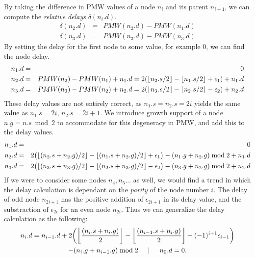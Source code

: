 By taking the difference in PMW values of a node $n_i$ and its parent $n_{i-1}$, we can compute the \emph{relative delays} $\delta(n_i.d)$.
\begin{eqnarray*}
  \delta(n_2.d) &=& PMW(n_2.d) - PMW(n_1.d) \\
  \delta(n_3.d) &=& PMW(n_3.d) - PMW(n_3.d)
\end{eqnarray*}
By setting the delay for the first node to some value, for example 0, we can find the node delay.
\begin{eqnarray*}
  n_1.d &=& 0 \\
  n_2.d &=& PMW(n_2) - PMW(n_1) + n_1.d = 2({\left \lfloor n_2.s/2 \right \rfloor } - {\left \lfloor n_1.s/2 \right \rfloor } + \epsilon_1) + n_1.d \\
  n_3.d &=& PMW(n_3) - PMW(n_2) + n_2.d = 2({\left \lfloor n_3.s/2 \right \rfloor } - {\left \lfloor n_2.s/2 \right \rfloor } - \epsilon_2) + n_2.d
\end{eqnarray*}
These delay values are not entirely correct, as $n_1.s = n_2.s = 2i$ yields the same value as  $n_1.s = 2i$, $n_2.s = 2i + 1$. We introduce growth support of a node $n.g = n.s \bmod 2$ to accommodate for this degeneracy in PMW, and add this to the delay values.
\begin{eqnarray*}
  n_1.d &=& 0 \\
  n_2.d &=& 2\big({\left \lfloor (n_2.s+n_2.g)/2 \right \rfloor } - {\left \lfloor (n_1.s+n_2.g)/2 \right \rfloor } + \epsilon_1\big) - (n_1.g + n_2.g)\bmod 2 + n_1.d \\
  n_3.d &=& 2\big({\left \lfloor (n_3.s+n_3.g)/2 \right \rfloor } - {\left \lfloor (n_2.s+n_3.g)/2 \right \rfloor } - \epsilon_2\big) - (n_3.g + n_2.g)\bmod 2 + n_2.d
\end{eqnarray*}
If we were to consider some nodes $n_4, n_5...$ as well, we would find a trend in which the delay calculation is dependant on the \emph{parity} of the node number $i$. The delay of odd node $n_{2i+1}$ has the positive addition of $\epsilon_{2i+1}$ in its delay value, and the substraction of $\epsilon_{2i}$ for an even node $n_{2i}$. Thus we can generalize the delay calculation as the following:
\begin{multline}\label{eq:1ddelay}
n_i.d = n_{i-1}.d + 2\bigg({\left \lfloor \frac{(n_i.s+n_i.g)}{2} \right \rfloor } - {\left \lfloor \frac{(n_{i-1}.s+n_i.g)}{2} \right \rfloor } + (-1)^{i+1}\epsilon_{i-1}\bigg) \\
         - (n_{i}.g + n_{i-1}.g)\bmod 2 \hspace{.5cm} | \hspace{.5cm} n_0.d = 0.
\end{multline}

